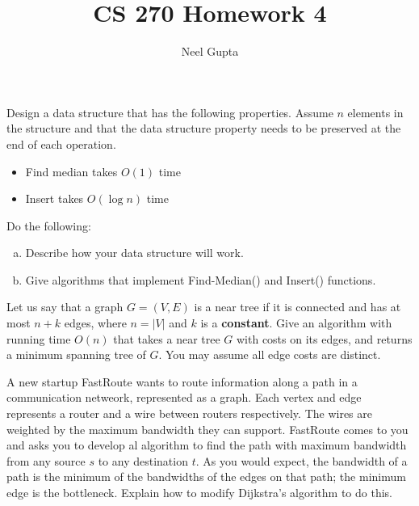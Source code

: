 \documentclass[12pt]{article}
\newenvironment{problem}[2][Problem]{\begin{trivlist}
\item[\hskip \labelsep {\bfseries #1}\hskip \labelsep {\bfseries #2.}]}{\end{trivlist}}
\begin{document}

\title{\vspace{-4cm}CS 270 Homework 4}
\author{Neel Gupta} 
\maketitle

\begin{problem}{1}
    Design a data structure that has the following properties. Assume $n$ elements in the structure and that the data structure property needs to be preserved at the end of each operation.
    \begin{itemize}
        \item Find median takes $O(1)$ time
        \item Insert takes $O(\log n)$ time
    \end{itemize}
    Do the following:
    \begin{enumerate}[(a)]
        \item Describe how your data structure will work.
        \item Give algorithms that implement Find-Median() and Insert() functions.
    \end{enumerate}
\end{problem}
\begin{problem}{2}
    Let us say that a graph $G=(V,E)$ is a near tree if it is connected and has at most $n+k$ edges, where $n=|V|$ and $k$ is a \textbf{constant}. Give an algorithm with running time $O(n)$ that takes a near tree $G$ with costs on its edges, and returns a minimum spanning tree of $G$. You may assume all edge costs are distinct.
\end{problem}
\begin{problem}{3}
    A new startup FastRoute wants to route information along a path in a communication netweork, represented as a graph. Each vertex and edge represents a router and a wire between routers respectively. The wires are weighted by the maximum bandwidth they can support. FastRoute comes to you and asks you to develop al algorithm to find the path with maximum bandwidth from any source $s$ to any destination $t$. As you would expect, the bandwidth of a path is the minimum of the bandwidths of the edges on that path; the minimum edge is the bottleneck. Explain how to modify Dijkstra's algorithm to do this.
\end{problem}
\end{document}
